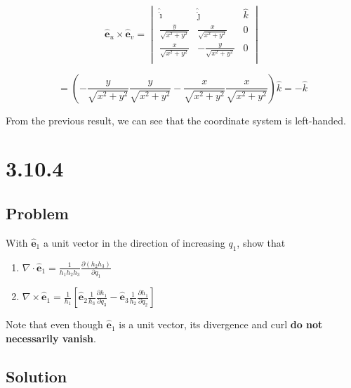 \documentclass[12pt]{article}
\begin{document}
\[
    \hat{\textbf{e}}_u \times \hat{\textbf{e}}_v =
    \begin{vmatrix}
        \hat{\dot{\imath}}         & \hat{\dot{\jmath}}          & \hat{k} \\
        \frac{y}{\sqrt{x^2 + y^2}} & \frac{x}{\sqrt{x^2 + y^2}}  & 0       \\
        \frac{x}{\sqrt{x^2 + y^2}} & -\frac{y}{\sqrt{x^2 + y^2}} & 0       \\
    \end{vmatrix}
\]

\[
    = \left(
    - \frac{y}{\sqrt{x^2 + y^2}} \frac{y}{\sqrt{x^2 + y^2}}
    - \frac{x}{\sqrt{x^2 + y^2}} \frac{x}{\sqrt{x^2 + y^2}}
    \right) \hat{k} = -\hat{k}
\]

From the previous result, we can see that the coordinate system is left-handed.

\section{3.10.4}

\subsection{Problem}

With \(\hat{\textbf{e}}_1\) a unit vector in the direction of increasing \(q_1\), show that
\bigskip

\begin{enumerate}[label= \textbf{(\alph*)}]
    \item
          \(
          \nabla \cdot \hat{\textbf{e}}_1 =
          \frac{1}{h_1 h_2 h_3} \frac{\partial \left(h_2 h_3\right)}{\partial q_1}
          \)

    \item
          \(
          \nabla \times \hat{\textbf{e}}_1 = \frac{1}{h_1}
          \left[
              \hat{\textbf{e}}_2 \frac{1}{h_3} \frac{\partial h_1}{\partial q_3}
              - \hat{\textbf{e}}_3  \frac{1}{h_2}  \frac{\partial h_1}{\partial q_2}
              \right]
          \)
\end{enumerate}
\bigskip

Note that even though \(\hat{\textbf{e}}_1\) is a unit vector, its divergence and curl \textbf{do
    not necessarily vanish}.

\subsection{Solution}
\end{document}
